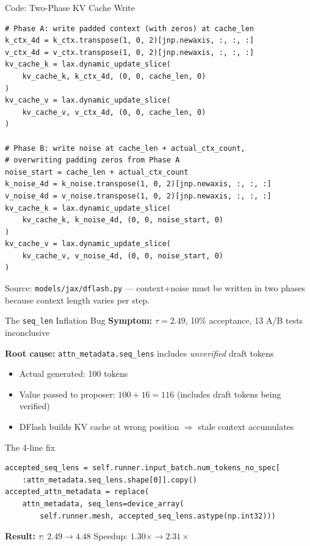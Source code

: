 \documentclass[10pt]{beamer}
\begin{document}
\begin{frame}[fragile]{Code: Two-Phase KV Cache Write}
\begin{lstlisting}
# Phase A: write padded context (with zeros) at cache_len
k_ctx_4d = k_ctx.transpose(1, 0, 2)[jnp.newaxis, :, :, :]
v_ctx_4d = v_ctx.transpose(1, 0, 2)[jnp.newaxis, :, :, :]
kv_cache_k = lax.dynamic_update_slice(
    kv_cache_k, k_ctx_4d, (0, 0, cache_len, 0)
)
kv_cache_v = lax.dynamic_update_slice(
    kv_cache_v, v_ctx_4d, (0, 0, cache_len, 0)
)

# Phase B: write noise at cache_len + actual_ctx_count,
# overwriting padding zeros from Phase A
noise_start = cache_len + actual_ctx_count
k_noise_4d = k_noise.transpose(1, 0, 2)[jnp.newaxis, :, :, :]
v_noise_4d = v_noise.transpose(1, 0, 2)[jnp.newaxis, :, :, :]
kv_cache_k = lax.dynamic_update_slice(
    kv_cache_k, k_noise_4d, (0, 0, noise_start, 0)
)
kv_cache_v = lax.dynamic_update_slice(
    kv_cache_v, v_noise_4d, (0, 0, noise_start, 0)
)
\end{lstlisting}
\vspace{-0.5em}
{\footnotesize Source: \texttt{models/jax/dflash.py} --- context+noise must be written in two phases because context length varies per step.}
\end{frame}

\begin{frame}[fragile]{The \texttt{seq\_len} Inflation Bug}
\textbf{Symptom:} $\tau = 2.49$, 10\% acceptance, 13 A/B tests inconclusive

\vspace{0.5em}
\textbf{Root cause:} \texttt{attn\_metadata.seq\_lens} includes \emph{unverified} draft tokens
\begin{itemize}
  \item Actual generated: 100 tokens
  \item Value passed to proposer: $100 + 16 = 116$ (includes draft tokens being verified)
  \item DFlash builds KV cache at wrong position $\Rightarrow$ stale context accumulates
\end{itemize}

\begin{alertblock}{The 4-line fix}
\begin{lstlisting}[backgroundcolor=\color{white},frame=none,xleftmargin=0pt]
accepted_seq_lens = self.runner.input_batch.num_tokens_no_spec[
    :attn_metadata.seq_lens.shape[0]].copy()
accepted_attn_metadata = replace(
    attn_metadata, seq_lens=device_array(
        self.runner.mesh, accepted_seq_lens.astype(np.int32)))
\end{lstlisting}
\end{alertblock}

\textbf{Result:} $\tau$: $2.49 \rightarrow 4.48$ \quad Speedup: $1.30\times \rightarrow 2.31\times$
\end{frame}
\end{document}
